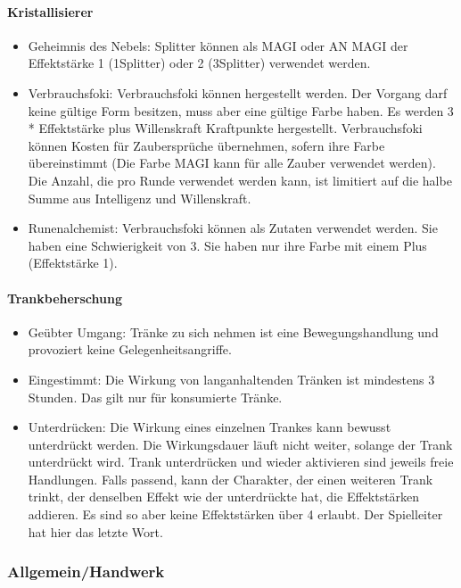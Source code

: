 \documentclass{article}
\begin{document}
\paragraph{Kristallisierer}

\begin{itemize}
\item Geheimnis des Nebels: Splitter können als MAGI oder AN MAGI der Effektstärke 1 (1Splitter) oder 2 (3Splitter) verwendet werden.
\item Verbrauchsfoki: Verbrauchsfoki können hergestellt werden. Der Vorgang darf keine gültige Form besitzen, muss aber eine gültige Farbe haben. Es werden 3 * Effektstärke plus Willenskraft Kraftpunkte hergestellt. Verbrauchsfoki können Kosten für Zaubersprüche übernehmen, sofern ihre Farbe übereinstimmt (Die Farbe MAGI kann für alle Zauber verwendet werden). Die Anzahl, die pro Runde verwendet werden kann, ist limitiert auf die halbe Summe aus Intelligenz und Willenskraft.
\item Runenalchemist: Verbrauchsfoki können als Zutaten verwendet werden. Sie haben eine Schwierigkeit von 3. Sie haben nur ihre Farbe mit einem Plus (Effektstärke 1).
\end{itemize}

\paragraph{Trankbeherschung}

\begin{itemize}
\item Geübter Umgang: Tränke zu sich nehmen ist eine Bewegungshandlung und provoziert keine Gelegenheitsangriffe.
\item Eingestimmt: Die Wirkung von langanhaltenden Tränken ist mindestens 3 Stunden. Das gilt nur für konsumierte Tränke.
\item Unterdrücken: Die Wirkung eines einzelnen Trankes kann bewusst unterdrückt werden. Die Wirkungsdauer läuft nicht weiter, solange der Trank unterdrückt wird. Trank unterdrücken und wieder aktivieren sind jeweils freie Handlungen. Falls passend, kann der Charakter, der einen weiteren Trank trinkt, der denselben Effekt wie der unterdrückte hat, die Effektstärken addieren. Es sind so aber keine Effektstärken über 4 erlaubt. Der Spielleiter hat hier das letzte Wort.
\end{itemize}

\subsubsection{Allgemein/Handwerk}
\end{document}
